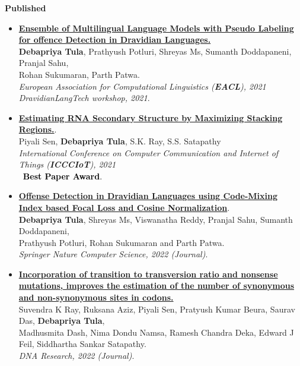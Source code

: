 \documentclass[10pt]{article}
\begin{document}
\textbf{\large{Published}}
\begin{itemize}
    \item \href{https://www.aclweb.org/anthology/2021.dravidianlangtech-1.42}{\textbf{Ensemble of Multilingual Language Models with Pseudo Labeling for offence Detection in Dravidian Languages.}}\\
    \textbf{Debapriya Tula}, Prathyush Potluri, Shreyas Ms, Sumanth Doddapaneni, Pranjal Sahu, \\Rohan Sukumaran, Parth Patwa.\\
    \emph{European Association for Computational Linguistics (\textbf{EACL}), 2021}\\
    \emph{DravidianLangTech workshop, 2021}.
    
    \item \href{https://doi.org/10.1007/978-981-15-6198-6_15}{\textbf{Estimating RNA Secondary Structure by Maximizing Stacking Regions.}}.\\
    Piyali Sen, \textbf{Debapriya Tula}, S.K. Ray, S.S. Satapathy \\
    \emph{International Conference on Computer Communication and Internet of Things (\textbf{ICCCIoT}), 2021} \\
    \faTrophy \textcolor{black}{~\textbf{Best Paper Award}.}
    
    \item \href{https://link.springer.com/article/10.1007/s42979-022-01190-1}{\textbf{Offense Detection in Dravidian Languages using Code-Mixing Index based Focal Loss and Cosine Normalization}}.\\
    \textbf{Debapriya Tula}, Shreyas Ms, Viswanatha Reddy, Pranjal Sahu, Sumanth Doddapaneni, \\Prathyush Potluri, Rohan Sukumaran and Parth Patwa.\\
    \emph{Springer Nature Computer Science, 2022 (Journal)}.
    
    \item \href{https://pubmed.ncbi.nlm.nih.gov/35920776/}{\textbf{Incorporation of transition to transversion ratio and nonsense mutations, improves the estimation of the number of synonymous and non-synonymous sites in codons.}}\\
    Suvendra K Ray, Ruksana Aziz, Piyali Sen, Pratyush Kumar Beura, Saurav Das, \textbf{Debapriya Tula}, \\
    Madhusmita Dash, Nima Dondu Namsa, Ramesh Chandra Deka, Edward J Feil, Siddhartha Sankar Satapathy.\\
    \emph{DNA Research, 2022 (Journal)}.

\end{itemize}
\vspace{-1.5mm}
\end{document}
